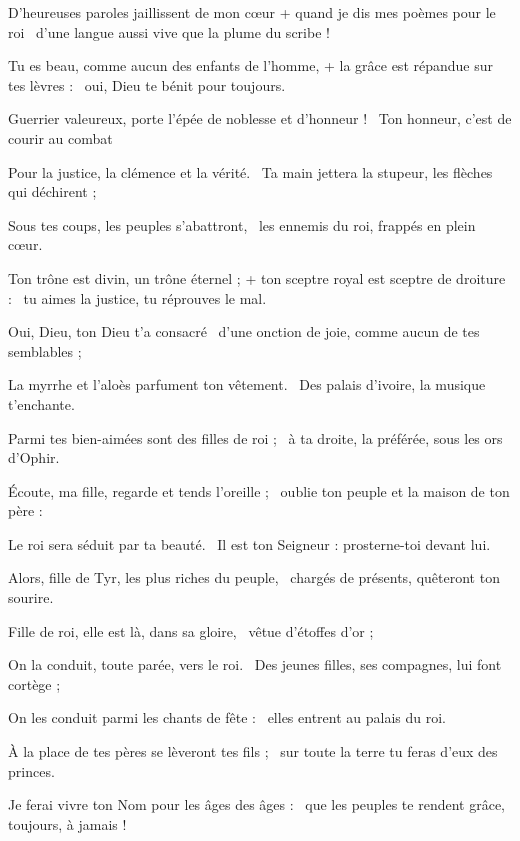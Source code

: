 \item D'heureuses paroles jaillissent de mon cœur + quand je dis mes poèmes pour le roi~\psstar{} d'une langue aussi vive que la plume du scribe !
\item Tu es beau, comme aucun des enfants de l'homme, + la grâce est répandue sur tes lèvres :~\psstar{} oui, Dieu te bénit pour toujours.
\item Guerrier valeureux, porte l'épée de noblesse et d'honneur !~\psstar{} Ton honneur, c'est de courir au combat 
\item Pour la justice, la clémence et la vérité.~\psstar{} Ta main jettera la stupeur, les flèches qui déchirent ; 
\item Sous tes coups, les peuples s'abattront,~\psstar{} les ennemis du roi, frappés en plein cœur.
\item Ton trône est divin, un trône éternel ; + ton sceptre royal est sceptre de droiture :~\psstar{} tu aimes la justice, tu réprouves le mal. 
\item Oui, Dieu, ton Dieu t'a consacré~\psstar{} d'une onction de joie, comme aucun de tes semblables ;
\item La myrrhe et l'aloès parfument ton vêtement.~\psstar{} Des palais d'ivoire, la musique t'enchante.
\item Parmi tes bien-aimées sont des filles de roi ;~\psstar{} à ta droite, la préférée, sous les ors d'Ophir.
\item Écoute, ma fille, regarde et tends l'oreille ;~\psstar{} oublie ton peuple et la maison de ton père :
\item Le roi sera séduit par ta beauté.~\psstar{} Il est ton Seigneur : prosterne-toi devant lui.
\item Alors, fille de Tyr, les plus riches du peuple,~\psstar{} chargés de présents, quêteront ton sourire.
\item Fille de roi, elle est là, dans sa gloire,~\psstar{} vêtue d'étoffes d'or ;
\item On la conduit, toute parée, vers le roi.~\psstar{} Des jeunes filles, ses compagnes, lui font cortège ;
\item On les conduit parmi les chants de fête :~\psstar{} elles entrent au palais du roi.
\item À la place de tes pères se lèveront tes fils ;~\psstar{} sur toute la terre tu feras d'eux des princes.
\item Je ferai vivre ton Nom pour les âges des âges :~\psstar{} que les peuples te rendent grâce, toujours, à jamais !
